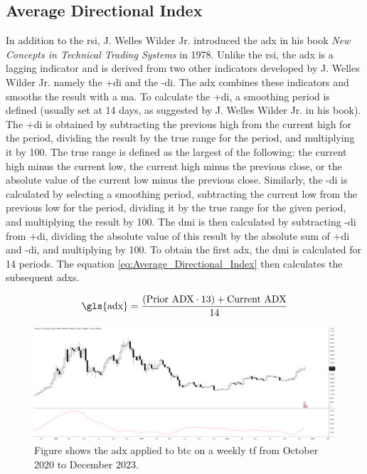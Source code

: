 \subsection{Average Directional Index}
\label{sub:ADX}
In addition to the \gls{rsi}, J. Welles Wilder Jr. introduced the \gls{adx} in his book \textit{New Concepts in Technical Trading Systems} \citep{Wilder_1978} in 1978. Unlike the \gls{rsi}, the \gls{adx} is a lagging indicator and is derived from two other indicators developed by J. Welles Wilder Jr. namely the \gls{+di} and the \gls{-di}. The \gls{adx} combines these indicators and smooths the result with a \gls{ma}.
\newline
\newline
To calculate the \gls{+di}, a smoothing period is defined (usually set at 14 days, as suggested by J. Welles Wilder Jr. in his book). The \gls{+di} is obtained by subtracting the previous high from the current high for the period, dividing the result by the true range for the period, and multiplying it by 100. The true range is defined as the largest of the following: the current high minus the current low, the current high minus the previous close, or the absolute value of the current low minus the previous close.
\newline
\newline
Similarly, the \gls{-di} is calculated by selecting a smoothing period, subtracting the current low from the previous low for the period, dividing it by the true range for the given period, and multiplying the result by 100. The \gls{dmi} is then calculated by subtracting \gls{-di} from \gls{+di}, dividing the absolute value of this result by the absolute sum of \gls{+di} and \gls{-di}, and multiplying by 100.
\newline
\newline
To obtain the first \gls{adx}, the \gls{dmi} is calculated for 14 periods. The equation \ref{eq:Average_Directional_Index} then calculates the subsequent \glspl{adx}.

\begin{equation}
    \centering
    \text{\gls{adx}} = \frac{(\text{Prior ADX} \cdot 13) + \text{Current ADX}}{14}
    \label{eq:Average_Directional_Index}
\end{equation}

\begin{figure}[ht]
    \centering
    \includegraphics[width=\textwidth]{./assets/img/btc-adx.png}
    \caption{Figure shows the \gls{adx} applied to \gls{btc} on a weekly \gls{tf} from October 2020 to December 2023.}
    \label{fig:adx}
\end{figure}

